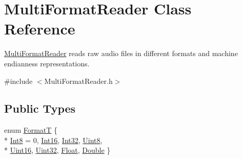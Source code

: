 \hypertarget{class_multi_format_reader}{}\section{Multi\+Format\+Reader Class Reference}
\label{class_multi_format_reader}


\hyperlink{class_multi_format_reader}{Multi\+Format\+Reader} reads raw audio files in different formats and machine endianness representations.  




{\ttfamily \#include $<$Multi\+Format\+Reader.\+h$>$}

\subsection*{Public Types}
\begin{DoxyCompactItemize}
\item 
enum \hyperlink{class_multi_format_reader_a6669d0a4e5bb7b72224b6769fea22566}{FormatT} \{ \\*
\hyperlink{class_multi_format_reader_a6669d0a4e5bb7b72224b6769fea22566a72c30f7ddbe3afc7abd8e56e1b402b92}{Int8} = 0, 
\hyperlink{class_multi_format_reader_a6669d0a4e5bb7b72224b6769fea22566acc7a415ab5d8c16475bd3f546967f046}{Int16}, 
\hyperlink{class_multi_format_reader_a6669d0a4e5bb7b72224b6769fea22566a98e833af2a8e375bed513cb9cf5819dd}{Int32}, 
\hyperlink{class_multi_format_reader_a6669d0a4e5bb7b72224b6769fea22566a76b10754067e189b4d75ede3a922e507}{Uint8}, 
\\*
\hyperlink{class_multi_format_reader_a6669d0a4e5bb7b72224b6769fea22566aca3abac130f3a0441fa66ce090bedf40}{Uint16}, 
\hyperlink{class_multi_format_reader_a6669d0a4e5bb7b72224b6769fea22566a858f7120c77bad5061a1a2cb4e61763c}{Uint32}, 
\hyperlink{class_multi_format_reader_a6669d0a4e5bb7b72224b6769fea22566a2eaaacc5845f95643712f0f3fd811f3f}{Float}, 
\hyperlink{class_multi_format_reader_a6669d0a4e5bb7b72224b6769fea22566aa7474bb98cf05a35905a55aef28e98a3}{Double}
 \}
\end{DoxyCompactItemize}

